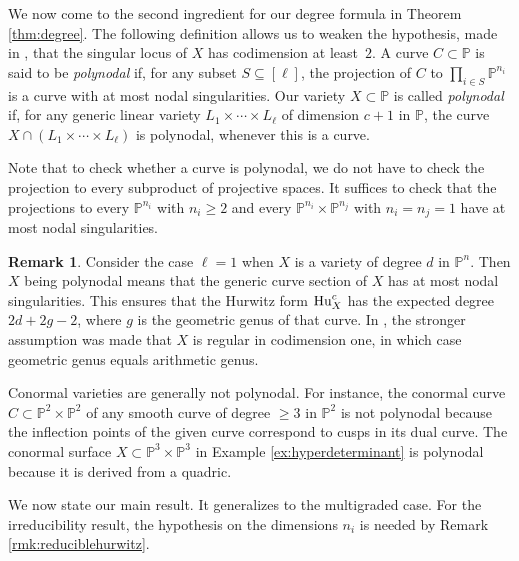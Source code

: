 \documentclass[12pt]{article}
\theoremstyle{definition}
\newtheorem{remark}[theorem]{Remark}
\newenvironment{example}
{\pushQED{\qed}\renewcommand{\qedsymbol}{$\diamond$}\examplex}
{\popQED\endexamplex}
\newcommand{\bP}{\mathbb P}
\begin{document}
We now come to the second ingredient for our degree formula
in Theorem \ref{thm:degree}.
The following definition
 allows us to weaken the hypothesis, made in \cite[Theorem 1.1]{hurwitz},
that the singular locus of $X$ has codimension at least~$2$.
A curve $C \subset \bP$ is said to be \emph{polynodal} if, for any subset $S\subseteq [\ell]$, the projection of $C$ to $\prod_{i\in S}\bP^{n_i}$ is a curve with at most nodal singularities. Our variety $X \subset \bP$  is called \emph{polynodal} if, for any generic linear variety $L_1\times\cdots\times L_\ell$
of dimension $c+1$ in $\bP$, the curve $X\cap (L_1\times\cdots\times L_\ell)$ is polynodal,
whenever this is a curve.

Note that to check whether a curve is polynodal, we do not have to check the projection to every subproduct of projective spaces.
It suffices to check that the projections to every $\bP^{n_i}$ with $n_i \geq 2$ and every $\bP^{n_i} \times \bP^{n_j}$ with $n_i = n_j = 1$ have at most nodal singularities.

\begin{remark}
Consider the case $\ell=1$ when $X$
is a variety of degree $d$ in $\bP^n$. Then $X$ being polynodal means that 
the generic curve section of $X$ has at most nodal singularities.
This ensures that the Hurwitz form
${\rm Hu}^c_X$ has the expected degree $2d+2g-2$, where $g$ is the
geometric genus of that curve. In \cite[Theorem 1.1]{hurwitz},
the stronger assumption was made that $X$ is regular in codimension one, in
which case geometric genus equals  arithmetic genus.
\end{remark}

\begin{example} Conormal varieties are generally not polynodal.
For instance, the conormal curve $C \subset \bP^2 \times \bP^2$
of any smooth curve of degree $\geq 3$ in $\bP^2$ is not polynodal
because the inflection points of  the given curve correspond to cusps in its dual curve. The conormal surface $X \subset \bP^3 \times \bP^3$ in Example
\ref{ex:hyperdeterminant} is polynodal because it is derived
from a quadric.
\end{example}

We now state our main result. It generalizes \cite[Theorem 1.1]{hurwitz} to the multigraded case.
For the irreducibility result, the hypothesis on the dimensions $n_i$ is needed by
Remark \ref{rmk:reduciblehurwitz}.
\end{document}
